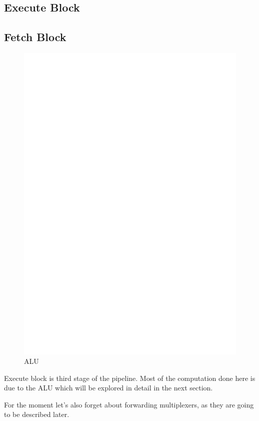 \documentclass[12pt]{article}
\begin{document}
\subsection{Execute Block}
\subsection{Fetch Block}
\begin{figure}[ht!]
	\includegraphics[width=\textwidth, center]{images/DLX_ALU.eps}
	\caption{ALU}
	\label{ALU}
\end{figure}
Execute block is third stage of the pipeline. Most of the computation done here is due to the ALU which will be explored in detail in the next section.

For the moment let's also forget about forwarding multiplexers, as they are going to be described later.
\end{document}
